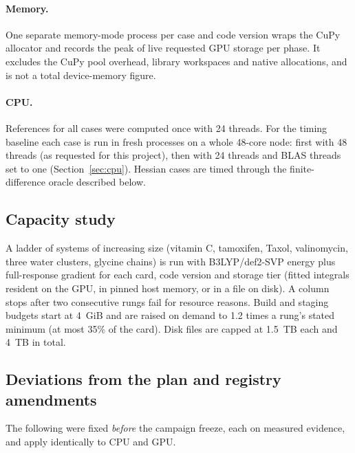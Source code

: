 \paragraph{Memory.} One separate memory-mode process per case and code version wraps the CuPy allocator and records the peak of live requested GPU storage per phase. It excludes the CuPy pool overhead, library workspaces and native allocations, and is not a total device-memory figure.

\paragraph{CPU.} References for all cases were computed once with 24 threads. For the timing baseline each case is run in fresh processes on a whole 48-core node: first with 48 threads (as requested for this project), then with 24 threads and BLAS threads set to one (Section~\ref{sec:cpu}). Hessian cases are timed through the finite-difference oracle described below.

\subsection{Capacity study}

A ladder of systems of increasing size (vitamin C, tamoxifen, Taxol, valinomycin, three water clusters, glycine chains) is run with B3LYP/def2-SVP energy plus full-response gradient for each card, code version and storage tier (fitted integrals resident on the GPU, in pinned host memory, or in a file on disk). A column stops after two consecutive rungs fail for resource reasons. Build and staging budgets start at 4~GiB and are raised on demand to 1.2 times a rung's stated minimum (at most 35\% of the card). Disk files are capped at 1.5~TB each and 4~TB in total.

\subsection{Deviations from the plan and registry amendments}
\label{sec:deviations}

The following were fixed \emph{before} the campaign freeze, each on measured evidence, and apply identically to CPU and GPU.

